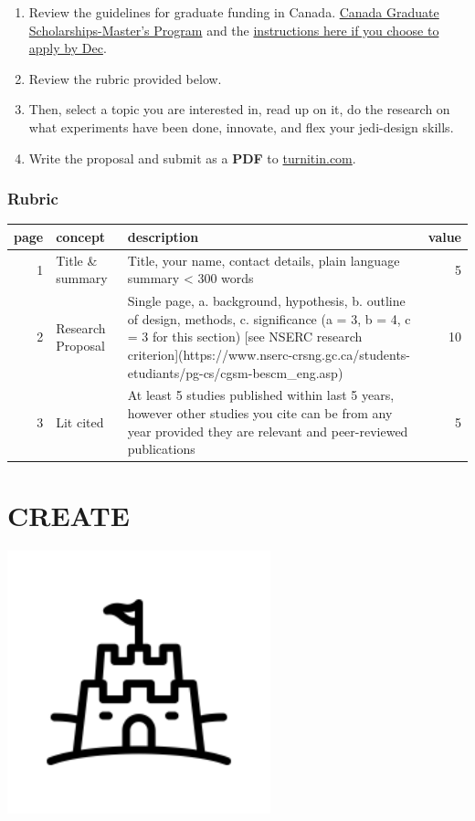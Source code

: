 \documentclass[
]{book}
\begin{document}
\begin{enumerate}
\def\labelenumi{\arabic{enumi}.}
\item
  Review the guidelines for graduate funding in Canada. \href{http://www.nserc-crsng.gc.ca/students-etudiants/pg-cs/cgsm-bescm_eng.asp}{Canada Graduate Scholarships-Master's Program} and the \href{http://www.nserc-crsng.gc.ca/ResearchPortal-PortailDeRecherche/Instructions-Instructions/CGS_M-BESC_M_eng.asp}{instructions here if you choose to apply by Dec}.
\item
  Review the rubric provided below.
\item
  Then, select a topic you are interested in, read up on it, do the research on what experiments have been done, innovate, and flex your jedi-design skills.
\item
  Write the proposal and submit as a \textbf{PDF} to \href{http://www.turnitin.com}{turnitin.com}.
\end{enumerate}

\hypertarget{rubric-1}{%
\subsection*{Rubric}\label{rubric-1}}

\begin{tabular}{r|l|l|r}
\hline
page & concept & description & value\\
\hline
1 & Title \& summary & Title, your name, contact details, plain language summary < 300 words & 5\\
\hline
2 & Research Proposal & Single page, a. background, hypothesis, b. outline of design, methods, c. significance (a = 3, b = 4, c = 3 for this section) [see NSERC research criterion](https://www.nserc-crsng.gc.ca/students-etudiants/pg-cs/cgsm-bescm\_eng.asp) & 10\\
\hline
3 & Lit cited & At least 5 studies published within last 5 years, however other studies you cite can be from any year provided they are relevant and peer-reviewed publications & 5\\
\hline
\end{tabular}

\hypertarget{create}{%
\chapter{CREATE}\label{create}}

\includegraphics[width=3in,height=\textheight]{./castle.png}
\end{document}
